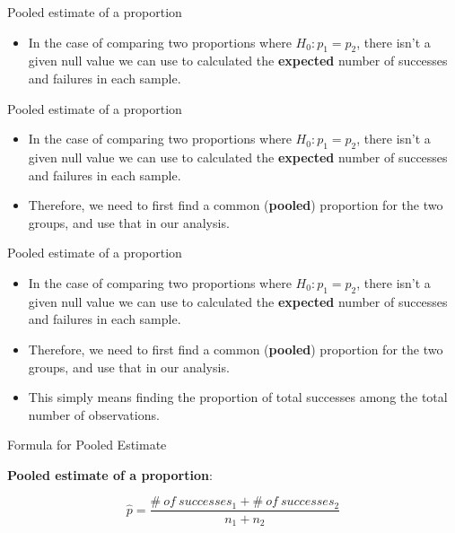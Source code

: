 \documentclass[
  ignorenonframetext,
]{beamer}
\providecommand{\tightlist}{%
  \setlength{\itemsep}{0pt}\setlength{\parskip}{0pt}}
\begin{document}
\begin{frame}{Pooled estimate of a proportion}
\protect\hypertarget{pooled-estimate-of-a-proportion}{}

\begin{itemize}
\tightlist
\item
  In the case of comparing two proportions where \(H_0: p_1 = p_2\),
  there isn't a given null value we can use to calculated the
  \textbf{expected} number of successes and failures in each sample.
\end{itemize}

\end{frame}

\begin{frame}{Pooled estimate of a proportion}
\protect\hypertarget{pooled-estimate-of-a-proportion-1}{}

\begin{itemize}
\tightlist
\item
  In the case of comparing two proportions where \(H_0: p_1 = p_2\),
  there isn't a given null value we can use to calculated the
  \textbf{expected} number of successes and failures in each sample.
\item
  Therefore, we need to first find a common (\textbf{pooled}) proportion
  for the two groups, and use that in our analysis.
\end{itemize}

\end{frame}

\begin{frame}{Pooled estimate of a proportion}
\protect\hypertarget{pooled-estimate-of-a-proportion-2}{}

\begin{itemize}
\tightlist
\item
  In the case of comparing two proportions where \(H_0: p_1 = p_2\),
  there isn't a given null value we can use to calculated the
  \textbf{expected} number of successes and failures in each sample.
\item
  Therefore, we need to first find a common (\textbf{pooled}) proportion
  for the two groups, and use that in our analysis.
\item
  This simply means finding the proportion of total successes among the
  total number of observations.
\end{itemize}

\end{frame}

\begin{frame}{Formula for Pooled Estimate}
\protect\hypertarget{formula-for-pooled-estimate}{}

\textbf{Pooled estimate of a proportion}:

\[
\hat{p} = \frac{\#~of~successes_1 + \#~of~successes_2}{n_1 + n_2}
\]

\end{frame}
\end{document}
